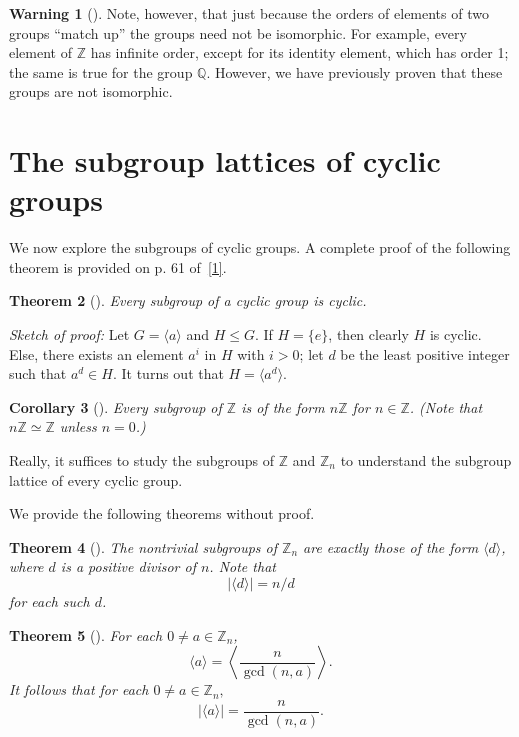 \documentclass[10pt,openany,oneside]{book}
\theoremstyle{plain}
\newtheorem{theorem}{Theorem}[section]
\newtheorem{corollary}[theorem]{Corollary}
\theoremstyle{definition}
\theoremstyle{definition}
\newtheorem{warning}[theorem]{Warning}
\theoremstyle{definition}
\theoremstyle{definition}
\numberwithin{equation}{section}
\def\Z{\mathbb{Z}}
\def\Q{\mathbb{Q}}
\begin{document}
\begin{warning}[]\label{warning-15}
Note, however, that just because the orders of elements of two groups ``match up'' the groups need not be isomorphic. For example, every element of \(\Z\) has infinite order, except for its identity element, which has order 1; the same is true for the group \(\Q\). However, we have previously proven that these groups are not isomorphic.%
\end{warning}
\typeout{************************************************}
\typeout{************************************************}
\section[{The subgroup lattices of cyclic groups}]{The subgroup lattices of cyclic groups}\label{section-16}
We now explore the subgroups of cyclic groups. A complete proof of the following theorem is provided on p. 61 of~\hyperlink{F}{[1]}.%
\begin{theorem}[{}]\label{subc}
Every subgroup of a cyclic group is cyclic.%
\end{theorem}
\emph{Sketch of proof:} Let \(G=\langle a\rangle\) and \(H\leq G\). If \(H=\{e\}\), then clearly \(H\) is cyclic. Else, there exists an element \(a^i\) in \(H\) with \(i>0\); let \(d\) be the least positive integer such that \(a^d\in H\). It turns out that \(H=\langle a^d\rangle\).%
\begin{corollary}[{}]\label{corollary-5}
Every subgroup of \(\Z\) is of the form \(n\Z\) for \(n\in \Z\). (Note that \(n\Z\simeq \Z\) unless \(n=0\).)%
\end{corollary}
Really, it suffices to study the subgroups of \(\Z\) and \(\Z_n\) to understand the subgroup lattice of every cyclic group.%
\par
We provide the following theorems without proof.%
\begin{theorem}[{}]\label{znsubgps}
The nontrivial subgroups of \(\Z_n\) are exactly those of the form \(\langle d\rangle\), where \(d\) is a positive divisor of \(n\). Note that%
\begin{equation*}
|\langle d\rangle |=n/d
\end{equation*}
for each such \(d\).%
\end{theorem}
\begin{theorem}[{}]\label{theorem-31}
For each \(0\neq a\in \Z_n\),%
\begin{equation*}
\langle a\rangle =\left\langle \frac{n}{\gcd(n,a)}\right\rangle.
\end{equation*}
It follows that for each \(0\neq a \in \Z_n,\)%
\begin{equation*}
|\langle a\rangle |=\frac{n}{\gcd(n,a)}.
\end{equation*}
%
\end{theorem}
\end{document}
